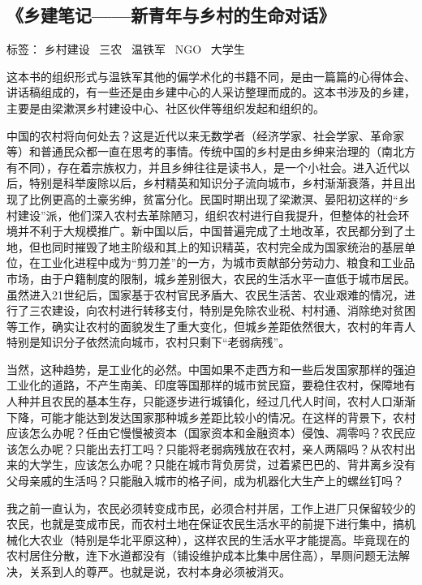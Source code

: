 \subsection{《乡建笔记——新青年与乡村的生命对话》}

标签： 乡村建设 \ 三农 \ 温铁军 \ NGO \ 大学生

这本书的组织形式与温铁军其他的偏学术化的书籍不同，是由一篇篇的心得体会、讲话稿组成的，有一些还是由乡建中心的人采访整理而成的。这本书涉及的乡建，主要是由梁漱溟乡村建设中心、社区伙伴等组织发起和组织的。

中国的农村将向何处去？这是近代以来无数学者（经济学家、社会学家、革命家等）和普通民众都一直在思考的事情。传统中国的乡村是由乡绅来治理的（南北方有不同），存在着宗族权力，并且乡绅往往是读书人，是一个小社会。进入近代以后，特别是科举废除以后，乡村精英和知识分子流向城市，乡村渐渐衰落，并且出现了比例更高的土豪劣绅，贫富分化。民国时期出现了梁漱溟、晏阳初这样的“乡村建设”派，他们深入农村去革除陋习，组织农村进行自我提升，但整体的社会环境并不利于大规模推广。新中国以后，中国普遍完成了土地改革，农民都分到了土地，但也同时摧毁了地主阶级和其上的知识精英，农村完全成为国家统治的基层单位，在工业化进程中成为“剪刀差”的一方，为城市贡献部分劳动力、粮食和工业品市场，由于户籍制度的限制，城乡差别很大，农民的生活水平一直低于城市居民。虽然进入21世纪后，国家基于农村官民矛盾大、农民生活苦、农业艰难的情况，进行了三农建设，向农村进行转移支付，特别是免除农业税、村村通、消除绝对贫困等工作，确实让农村的面貌发生了重大变化，但城乡差距依然很大，农村的年青人特别是知识分子依然流向城市，农村只剩下“老弱病残”。

当然，这种趋势，是工业化的必然。中国如果不走西方和一些后发国家那样的强迫工业化的道路，不产生南美、印度等国那样的城市贫民窟，要稳住农村，保障地有人种并且农民的基本生存，只能逐步进行城镇化，经过几代人时间，农村人口渐渐下降，可能才能达到发达国家那种城乡差距比较小的情况。在这样的背景下，农村应该怎么办呢？任由它慢慢被资本（国家资本和金融资本）侵蚀、凋零吗？农民应该怎么办呢？只能出去打工吗？只能将老弱病残放在农村，亲人两隔吗？从农村出来的大学生，应该怎么办呢？只能在城市背负房贷，过着紧巴巴的、背井离乡没有父母亲戚的生活吗？只能融入城市的格子间，成为机器化大生产上的螺丝钉吗？

我之前一直认为，农民必须转变成市民，必须合村并居，工作上进厂只保留较少的农民，也就是变成市民，而农村土地在保证农民生活水平的前提下进行集中，搞机械化大农业（特别是华北平原这种），这样农民的生活水平才能提高。毕竟现在的农村居住分散，连下水道都没有（铺设维护成本比集中居住高），旱厕问题无法解决，关系到人的尊严。也就是说，农村本身必须被消灭。

